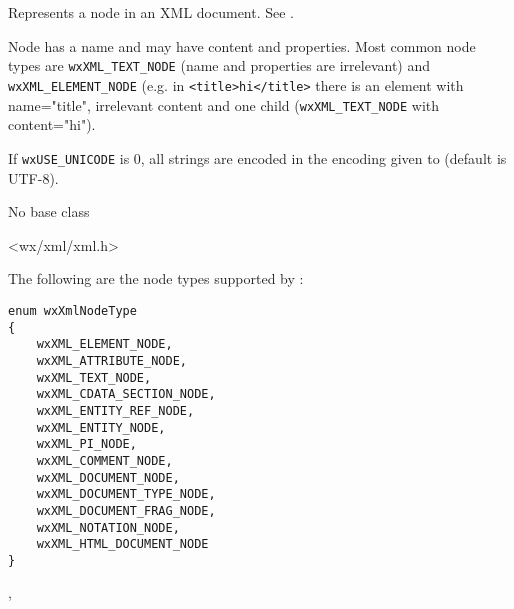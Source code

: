 
\section{}\label{wxxmlnode}

Represents a node in an XML document. See .

Node has a name and may have content
and properties. Most common node types are {\tt wxXML\_TEXT\_NODE} (name and
properties are irrelevant) and {\tt wxXML\_ELEMENT\_NODE} (e.g. in {\tt <title>hi</title>} there is
an element with name="title", irrelevant content and one child ({\tt wxXML\_TEXT\_NODE}
with content="hi").

If \texttt{wxUSE\_UNICODE} is 0, all strings are encoded in the encoding given to
 (default is UTF-8).



No base class


<wx/xml/xml.h>


The following are the node types supported by :

{\small
\begin{verbatim}
enum wxXmlNodeType
{
    wxXML_ELEMENT_NODE,
    wxXML_ATTRIBUTE_NODE,
    wxXML_TEXT_NODE,
    wxXML_CDATA_SECTION_NODE,
    wxXML_ENTITY_REF_NODE,
    wxXML_ENTITY_NODE,
    wxXML_PI_NODE,
    wxXML_COMMENT_NODE,
    wxXML_DOCUMENT_NODE,
    wxXML_DOCUMENT_TYPE_NODE,
    wxXML_DOCUMENT_FRAG_NODE,
    wxXML_NOTATION_NODE,
    wxXML_HTML_DOCUMENT_NODE
}
\end{verbatim}
}


, 




\label{wxxmlnodewxxmlnode}


